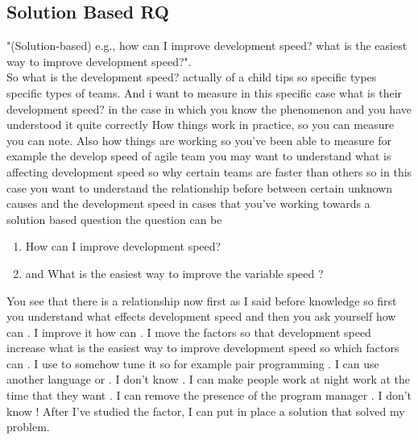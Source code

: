 \documentclass[conference, compsoc, twoside]{IEEEtran}
\begin{document}
\subsection{Solution Based RQ} %
"(Solution-based) e.g., how can I improve development speed? what is the easiest way to improve development speed?".\\
So what is the development speed? actually of a child tips so specific types specific types of teams. 
And i want to measure in this specific case what is their development speed? 
in the case in which you know the phenomenon and you have understood it quite correctly
 How things work in practice, so you can measure you can note.
Also how things are working so you've been able to measure for example the develop speed of agile team you may want to understand what is affecting development speed so why certain teams are faster than others so in this case you want to understand the relationship before between certain unknown causes and the development speed in cases that you've working towards a solution based question the question can be 
\begin{enumerate}
	\item How can I improve development speed? 
	\item and What is the easiest way to improve the variable speed ?
\end{enumerate}  
 You see that there is a relationship now first as I said before knowledge so first you understand what effects development speed and then you ask yourself how can .
I improve it how can .
I move the factors so that development speed increase what is the easiest way to improve development speed so which factors can .
I use to somehow tune it so for example pair programming .
I can use another language or .
I don't know .
I can make people work at night work at the time that they want .
I can remove the presence of the program manager .
I don't know !
After I've studied the factor, I can put in place a solution that solved my problem.
\end{document}
